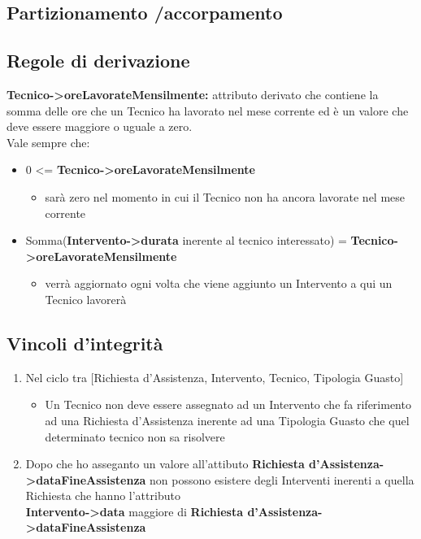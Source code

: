 \documentclass[legalpaper]{article}
\begin{document}
\subsection{Partizionamento /accorpamento}

\subsection{Regole di derivazione}
\textbf{Tecnico->oreLavorateMensilmente:} attributo derivato che contiene la somma delle ore che un Tecnico ha lavorato nel mese corrente ed è un valore che deve essere maggiore o uguale a zero.\\
Vale sempre che: 
\begin{itemize}
	\item  0 <= \textbf{Tecnico->oreLavorateMensilmente}
		\begin{itemize}\item sarà zero nel momento in cui il Tecnico non ha ancora lavorate nel mese corrente\end{itemize}
	\item Somma(\textbf{Intervento->durata} inerente al tecnico interessato) = \textbf{Tecnico->oreLavorateMensilmente}
		\begin{itemize}
		\item verrà aggiornato ogni volta che viene aggiunto un Intervento a qui un Tecnico lavorerà
		\end{itemize}
\end{itemize}
\subsection{Vincoli d'integrità}
	\begin{enumerate}
	\item Nel ciclo tra [Richiesta d'Assistenza, Intervento, Tecnico, Tipologia Guasto]
		\begin{itemize}
		\item Un Tecnico non deve essere assegnato ad un Intervento che fa riferimento ad una Richiesta d'Assistenza inerente ad una Tipologia Guasto che quel determinato tecnico non sa risolvere
		\end{itemize}
	\item Dopo che ho asseganto un valore all'attibuto \textbf{Richiesta d'Assistenza->dataFineAssistenza} non possono esistere degli Interventi inerenti a quella Richiesta che hanno l'attributo\\
\textbf{Intervento->data} maggiore di \textbf{Richiesta d'Assistenza->dataFineAssistenza}
\end{enumerate}
\end{document}

